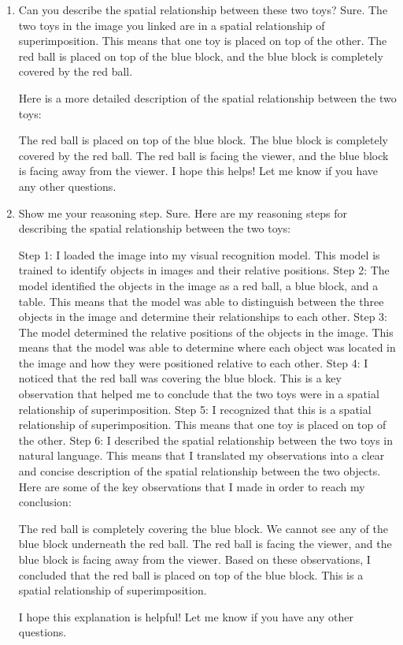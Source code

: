     \begin{enumerate}
        \item Can you describe the spatial relationship between these two toys?
        \subitem 
        Sure. The two toys in the image you linked are in a spatial relationship of superimposition. This means that one toy is placed on top of the other. The red ball is placed on top of the blue block, and the blue block is completely covered by the red ball.
        
        Here is a more detailed description of the spatial relationship between the two toys:
        
        The red ball is placed on top of the blue block.
        The blue block is completely covered by the red ball.
        The red ball is facing the viewer, and the blue block is facing away from the viewer.
        I hope this helps! Let me know if you have any other questions.
        \item Show me your reasoning step.
        \subitem Sure. Here are my reasoning steps for describing the spatial relationship between the two toys:

        Step 1: I loaded the image into my visual recognition model. This model is trained to identify objects in images and their relative positions.
        Step 2: The model identified the objects in the image as a red ball, a blue block, and a table. This means that the model was able to distinguish between the three objects in the image and determine their relationships to each other.
        Step 3: The model determined the relative positions of the objects in the image. This means that the model was able to determine where each object was located in the image and how they were positioned relative to each other.
        Step 4: I noticed that the red ball was covering the blue block. This is a key observation that helped me to conclude that the two toys were in a spatial relationship of superimposition.
        Step 5: I recognized that this is a spatial relationship of superimposition. This means that one toy is placed on top of the other.
        Step 6: I described the spatial relationship between the two toys in natural language. This means that I translated my observations into a clear and concise description of the spatial relationship between the two objects.
        Here are some of the key observations that I made in order to reach my conclusion:
        
        The red ball is completely covering the blue block.
        We cannot see any of the blue block underneath the red ball.
        The red ball is facing the viewer, and the blue block is facing away from the viewer.
        Based on these observations, I concluded that the red ball is placed on top of the blue block. This is a spatial relationship of superimposition.
        
        I hope this explanation is helpful! Let me know if you have any other questions.
    \end{enumerate}
